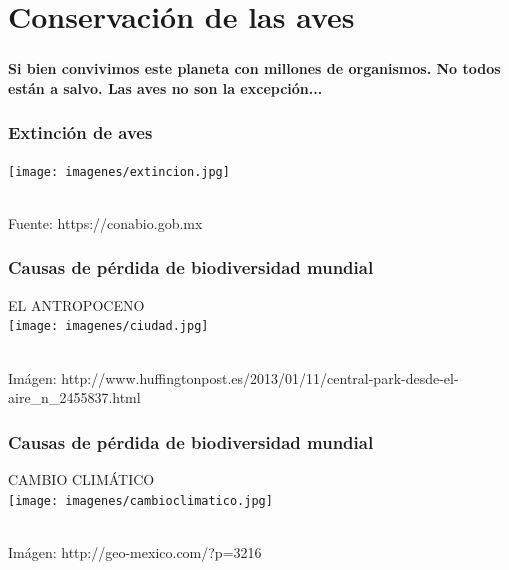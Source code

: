 \documentclass[compress]{beamer}
\begin{document}
\section{Conservación de las aves}

{
  \begin{frame}
    \frametitle{}
    \textbf{
      Si bien convivimos este planeta con millones de organismos.
      No todos están a salvo.
      Las aves no son la excepción...}
   \end{frame}
}

{
  \begin{frame}
    \frametitle{Extinción de aves}
      \begin{center}
	\texttt{[image: imagenes/extincion.jpg]}\\
	\captionof{}{}
      \end{center}\\[-0.2cm]

   \tiny{Fuente: https://conabio.gob.mx }   \end{frame}
}


{
  \begin{frame}
    \frametitle{Causas de pérdida de biodiversidad mundial}
    
      \begin{center}
	\LARGE EL ANTROPOCENO \\[0.2CM]
	\texttt{[image: imagenes/ciudad.jpg]}\\
	\captionof{}{}
      \end{center}\\[-0.2cm]

   \tiny{Imágen: http://www.huffingtonpost.es/2013/01/11/central-park-desde-el-aire_n_2455837.html }  
   \end{frame}
}

{
  \begin{frame}
    \frametitle{Causas de pérdida de biodiversidad mundial}
    
      \begin{center}
	\LARGE CAMBIO CLIMÁTICO \\[0.2CM]
	\texttt{[image: imagenes/cambioclimatico.jpg]}\\
	\captionof{}{}
      \end{center}\\[-0.2cm]

   \tiny{Imágen: http://geo-mexico.com/?p=3216 }  
   \end{frame}
}
\end{document}
